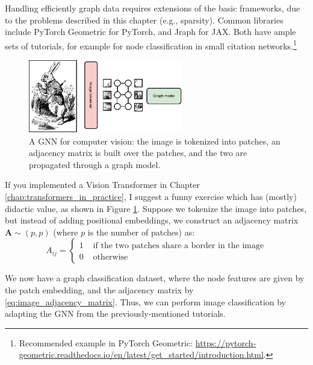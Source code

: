 Handling efficiently graph data requires extensions of the basic frameworks, due to the problems described in this chapter (e.g., sparsity). Common libraries include PyTorch Geometric for PyTorch, and Jraph for JAX. Both have ample sets of tutorials, for example for node classification in small citation networks.\footnote{Recommended example in PyTorch Geometric: \url{https://pytorch-geometric.readthedocs.io/en/latest/get_started/introduction.html}.}

\begin{figure}
    \centering
    \hspace{1em}\includegraphics[width=0.6\textwidth]{images/ImageGNN}
    \caption{A GNN for computer vision: the image is tokenized into patches, an adjacency matrix is built over the patches, and the two are propagated through a graph model.}
    \label{fig:image_gnn}
\end{figure}

If you implemented a Vision Transformer in Chapter \ref{chap:transformers_in_practice}, I suggest a funny exercise which has (mostly) didactic value, as shown in Figure \ref{fig:image_gnn}. Suppose we tokenize the image into patches, but instead of adding positional embeddings, we construct an adjacency matrix $\mathbf{A} \sim (p, p)$ (where $p$ is the number of patches) as:
%
\begin{equation}
A_{ij} = \begin{cases} 1 & \text{ if the two patches share a border in the image} \\ 0 & \text{ otherwise} \end{cases}
\label{eq:image_adjacency_matrix}
\end{equation}

We now have a graph classification dataset, where the node features are given by the patch embedding, and the adjacency matrix by \eqref{eq:image_adjacency_matrix}. Thus, we can perform image classification by adapting the GNN from the previously-mentioned tutorials.